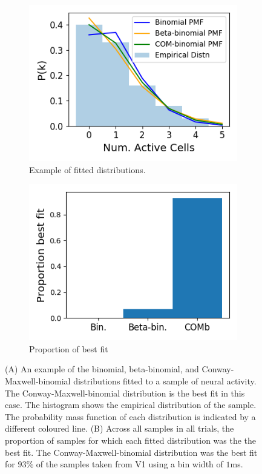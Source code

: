   \begin{figure}[h]
    \begin{subfigure}[h]{0.5\linewidth}
      \includegraphics[width=\linewidth]{figures/conway_maxwell/fitting_example.png}
      \caption{Example of fitted distributions.}
      \label{fig:fitting_example}
    \end{subfigure}
    \begin{subfigure}[h]{0.5\linewidth}
      \includegraphics[width=\linewidth]{figures/conway_maxwell/best_fit_proportion.png}
      \caption{Proportion of best fit}
      \label{fig:best_fit_proportion}
    \end{subfigure}
    \caption{(A) An example of the binomial, beta-binomial, and Conway-Maxwell-binomial distributions fitted to a sample of neural activity. The Conway-Maxwell-binomial distribution is the best fit in this case. The histogram shows the empirical distribution of the sample. The probability mass function of each distribution is indicated by a different coloured line. (B) Across all samples in all trials, the proportion of samples for which each fitted distribution was the the best fit. The Conway-Maxwell-binomial distribution was the best fit for $93\%$ of the samples taken from V1 using a bin width of $1$ms.}
    \label{fig:fitting}
  \end{figure}

